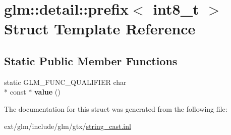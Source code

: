 \hypertarget{structglm_1_1detail_1_1prefix_3_01int8__t_01_4}{\section{glm\-:\-:detail\-:\-:prefix$<$ int8\-\_\-t $>$ Struct Template Reference}
\label{structglm_1_1detail_1_1prefix_3_01int8__t_01_4}
}
\subsection*{Static Public Member Functions}
\begin{DoxyCompactItemize}
\item 
\hypertarget{structglm_1_1detail_1_1prefix_3_01int8__t_01_4_afb4b2223c44e4e8f75bde375b0f874a2}{static G\-L\-M\-\_\-\-F\-U\-N\-C\-\_\-\-Q\-U\-A\-L\-I\-F\-I\-E\-R char \\*
const $\ast$ {\bfseries value} ()}\label{structglm_1_1detail_1_1prefix_3_01int8__t_01_4_afb4b2223c44e4e8f75bde375b0f874a2}

\end{DoxyCompactItemize}


The documentation for this struct was generated from the following file\-:\begin{DoxyCompactItemize}
\item 
ext/glm/include/glm/gtx/\hyperlink{string__cast_8inl}{string\-\_\-cast.\-inl}\end{DoxyCompactItemize}
